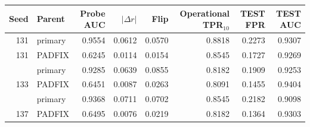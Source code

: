 \begin{tabular}{rlrrrrrr}
\toprule
Seed & Parent & Probe AUC & $|\Delta r|$ & Flip & Operational TPR$_{10}$ & TEST FPR & TEST AUC \\
\midrule
131 & primary & 0.9554 & 0.0612 & 0.0570 & 0.8818 & 0.2273 & 0.9307 \\
131 & PADFIX & 0.6245 & 0.0114 & 0.0154 & 0.8545 & 0.1727 & 0.9269 \\
\addlinespace
133 & primary & 0.9285 & 0.0639 & 0.0855 & 0.8182 & 0.1909 & 0.9253 \\
133 & PADFIX & 0.6451 & 0.0087 & 0.0263 & 0.8091 & 0.1455 & 0.9404 \\
\addlinespace
137 & primary & 0.9368 & 0.0711 & 0.0702 & 0.8545 & 0.2182 & 0.9098 \\
137 & PADFIX & 0.6495 & 0.0076 & 0.0219 & 0.8182 & 0.1364 & 0.9303 \\
\bottomrule
\end{tabular}

